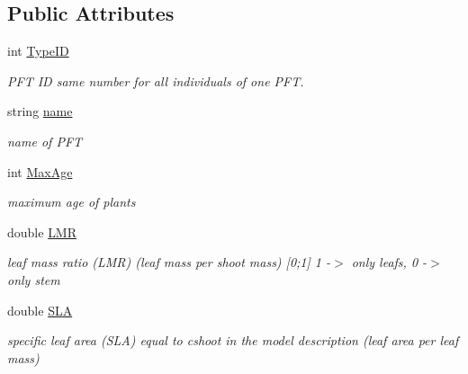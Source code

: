 \subsection*{Public Attributes}
\begin{DoxyCompactItemize}
\item 
\mbox{\label{class_s_pft_traits_a691c7422ba130ac025a4916f60f56e50}} 
int \mbox{\hyperlink{class_s_pft_traits_a691c7422ba130ac025a4916f60f56e50}{Type\+ID}}
\begin{DoxyCompactList}\small\item\em P\+FT ID same number for all individuals of one P\+FT. \end{DoxyCompactList}\item 
\mbox{\label{class_s_pft_traits_a5639574a1141f9b4c570a7632c9a1792}} 
string \mbox{\hyperlink{class_s_pft_traits_a5639574a1141f9b4c570a7632c9a1792}{name}}
\begin{DoxyCompactList}\small\item\em name of P\+FT \end{DoxyCompactList}\item 
\mbox{\label{class_s_pft_traits_a7475629bec8e6b2f82381214d26ff73a}} 
int \mbox{\hyperlink{class_s_pft_traits_a7475629bec8e6b2f82381214d26ff73a}{Max\+Age}}
\begin{DoxyCompactList}\small\item\em maximum age of plants \end{DoxyCompactList}\item 
\mbox{\label{class_s_pft_traits_a20431cf9b504e1bdd41efa42185753f1}} 
double \mbox{\hyperlink{class_s_pft_traits_a20431cf9b504e1bdd41efa42185753f1}{L\+MR}}
\begin{DoxyCompactList}\small\item\em leaf mass ratio (L\+MR) (leaf mass per shoot mass) \mbox{[}0;1\mbox{]} 1 -\/$>$ only leafs, 0 -\/$>$ only stem \end{DoxyCompactList}\item 
\mbox{\label{class_s_pft_traits_aa9072251334bf5a4b1fde276ff6134a4}} 
double \mbox{\hyperlink{class_s_pft_traits_aa9072251334bf5a4b1fde276ff6134a4}{S\+LA}}
\begin{DoxyCompactList}\small\item\em specific leaf area (S\+LA) equal to cshoot in the model description (leaf area per leaf mass) \end{DoxyCompactList}\item 

\end{DoxyCompactItemize}

